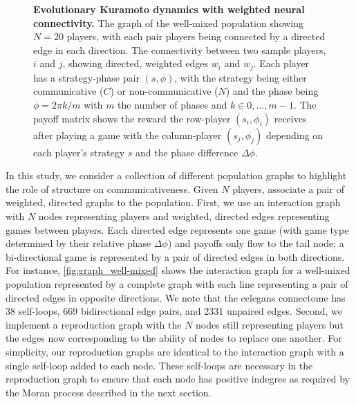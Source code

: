 \documentclass[pdflatex,lineno,referee,sn-nature]{sn-jnl}
\begin{document}
\begin{figure}
  \centering
  \begin{nomemoize} %
    \begin{subcaptiongroup}
        {\label{fig:payoff_matrix}\captiontext*{}}{%
        {\label{fig:player_interactions}\captiontext*{}}{%
        {\label{fig:graph_well-mixed}\captiontext*{}}{%
      {}%
    }}}
    \end{subcaptiongroup}
  \end{nomemoize}
  \caption{
    \textbf{
      Evolutionary Kuramoto dynamics with weighted neural connectivity.
    }
    The graph of the well-mixed population showing $N=20$ players,
    with each pair players being connected by a directed edge in each direction.
    The connectivity between two sample players, $i$ and $j$,
    showing directed, weighted edges $w_i$ and $w_j$.
    Each player has a strategy-phase pair $(s, \phi)$,
    with the strategy being either communicative ($C$) or non-communicative ($N$)
    and the phase being $\phi = 2\pi k/m$ with $m$ the number of phases
    and $k \in 0,\ldots,m-1$.
    The payoff matrix shows the reward the row-player $(s_i, \phi_i)$
    receives after playing a game with the column-player $(s_j, \phi_j)$
    depending on each player's strategy $s$ and the phase difference $\Delta \phi$.
  }
  \label{fig:connectivity}
\end{figure}

In this study, we consider a collection of different population graphs
to highlight the role of structure on communicativeness.
Given $N$ players, associate a pair
of weighted, directed graphs to the population.
First, we use an interaction graph with $N$ nodes representing players
and weighted, directed edges representing games between players.
Each directed edge represents one game
(with game type determined by their relative phase $\Delta \phi$)
and payoffs only flow to the tail node;
a bi-directional game is represented by a pair of directed edges
in both directions.
For instance, \cref{fig:graph_well-mixed} shows the interaction graph
for a well-mixed population represented by a complete graph
with each line representing a pair of directed edges in opposite directions.
We note that the \gls{celegans} connectome
has \num{38} self-loops, \num{669} bidirectional edge pairs,
and \num{2331} unpaired edges.
Second, we implement a reproduction graph with the $N$ nodes
still representing players
but the edges now corresponding to the ability of nodes to replace one another.
For simplicity, our reproduction graphs are identical to the interaction graph
with a single self-loop added to each node.
These self-loops are necessary in the reproduction graph
to ensure that each node has positive indegree
as required by the Moran process described in the next section.
\end{document}
